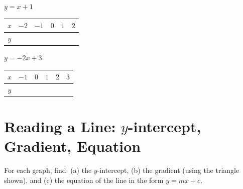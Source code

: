 \documentclass[11pt]{article}
\newcommand{\gridaxis}[5]{%
  \begin{axis}[
    width=7cm, height=6.4cm,
    xmin=#1, xmax=#2, ymin=#3, ymax=#4,
    grid=both, grid style={line width=.1pt, draw=gray!35},
    axis lines=middle,
    xlabel={$x$}, ylabel={$y$},
    xtick distance=#5, ytick distance=#5,
    tick label style={font=\tiny},
    label style={font=\small},
    xlabel style={at={(axis description cs:1,0)}, anchor=north west},
    ylabel style={at={(axis description cs:0,1)}, anchor=south east},
    axis line style={-{Latex[length=1.8mm]}},
  ]
}
\begin{document}
\begin{center}
\begin{minipage}{0.48\linewidth}
\centering
$y = x + 1$

\vspace{0.5em}
\begin{tabular}{|c|c|c|c|c|c|}
\hline
$x$ & $-2$ & $-1$ & $0$ & $1$ & $2$ \\\hline
$y$ & & & & & \\\hline
\end{tabular}

\vspace{0.8em}
\end{minipage}
\hfill
\begin{minipage}{0.48\linewidth}
\centering
$y = -2x + 3$

\vspace{0.5em}
\begin{tabular}{|c|c|c|c|c|c|}
\hline
$x$ & $-1$ & $0$ & $1$ & $2$ & $3$ \\\hline
$y$ & & & & & \\\hline
\end{tabular}

\vspace{0.8em}
\end{minipage}
\end{center}

\newpage
\section{Reading a Line: $y$-intercept, Gradient, Equation}
\noindent For each graph, find: (a) the $y$-intercept, (b) the gradient (using the triangle shown), and (c) the equation of the line in the form $y = mx + c$.
\end{document}
